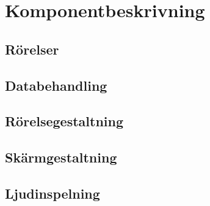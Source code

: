 \section{Komponentbeskrivning}

\subsection{Rörelser}


\subsection{Databehandling}


\subsection{Rörelsegestaltning}
\label{sub:touchmedia}


\subsection{Skärmgestaltning}
\label{sub:screenmedia}


\subsection{Ljudinspelning}


